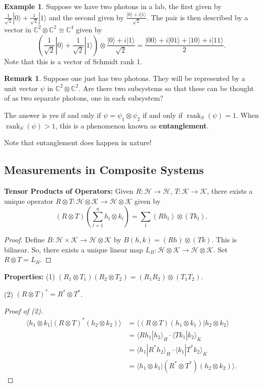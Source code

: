 \documentclass[12pt]{article}
\theoremstyle{definition}
\newtheorem*{example}{Example}
\newtheorem*{remark}{Remark}
\newcommand{\ket}[1]{|#1\rangle}
\DeclareMathOperator{\rank}{rank}
\newcommand{\C}{\mathbb{C}}
\begin{document}
\begin{example}
Suppose we have two photons in a lab, the first given by $\frac{1}{\sqrt{2}}\ket{0} + \frac{1}{\sqrt{2}}\ket{1}$ and the second given by $\frac{\ket{0}+i\ket{1}}{\sqrt{2}}$. The pair is then described by a vector in $\C^2 \otimes \C^2 \cong \C^4$ given by
\[
\left(\frac{1}{\sqrt{2}}\ket{0} + \frac{1}{\sqrt{2}}\ket{1}\right) \otimes \frac{\ket{0}+i\ket{1}}{\sqrt{2}} = \frac{\ket{00} + i\ket{01} + \ket{10} + i\ket{11}}{2}.
\]
Note that this is a vector of Schmidt rank 1.
\end{example}

\begin{remark}
Suppose one just has two photons. They will be represented by a unit vector $\psi$ in $\C^2 \otimes \C^2$. Are there two subsystems so that these can be thought of as two separate photons, one in each subsystem?

The answer is yes if and only if $\psi = \psi_1 \otimes \psi_2$ if and only if $\rank_S(\psi) = 1$. When $\rank_S(\psi) > 1$, this is a phenomenon known as \textbf{entanglement}.

Note that entanglement does happen in nature!
\end{remark}

\subsection{Measurements in Composite Systems}

\textbf{Tensor Products of Operators:} Given $R : \mathcal{H} \to \mathcal{H}$, $T : \mathcal{K} \to \mathcal{K}$, there exists a unique operator $R \otimes T : \mathcal{H} \otimes \mathcal{K} \to \mathcal{H} \otimes \mathcal{K}$ given by
\[
(R \otimes T)\left(\sum_{l=1}^n h_l \otimes k_l\right) = \sum_l (Rh_l) \otimes (Tk_l).
\]

\begin{proof}
Define $B : \mathcal{H} \times \mathcal{K} \to \mathcal{H} \otimes \mathcal{K}$ by $B(h,k) = (Rh) \otimes (Tk)$. This is bilinear. So, there exists a unique linear map $L_B : \mathcal{H} \otimes \mathcal{K} \to \mathcal{H} \otimes \mathcal{K}$. Set $R \otimes T = L_B$.
\end{proof}

\textbf{Properties:} (1) $(R_1 \otimes T_1)(R_2 \otimes T_2) = (R_1 R_2) \otimes (T_1 T_2)$.

(2) $(R \otimes T)^* = R^* \otimes T^*$.

\begin{proof}[Proof of (2)]
\begin{align*}
\langle h_1 \otimes k_1 | (R \otimes T)^*(h_2 \otimes k_2)\rangle &= \langle(R \otimes T)(h_1 \otimes k_1)|h_2 \otimes k_2\rangle \\
&= \langle Rh_1|h_2\rangle_H \cdot \langle Tk_1|k_2\rangle_K \\
&= \langle h_1|R^*h_2\rangle_H \cdot \langle k_1|T^*k_2\rangle_K \\
&= \langle h_1 \otimes k_1|(R^* \otimes T^*)(h_2 \otimes k_2)\rangle.
\end{align*}
\end{proof}
\end{document}
